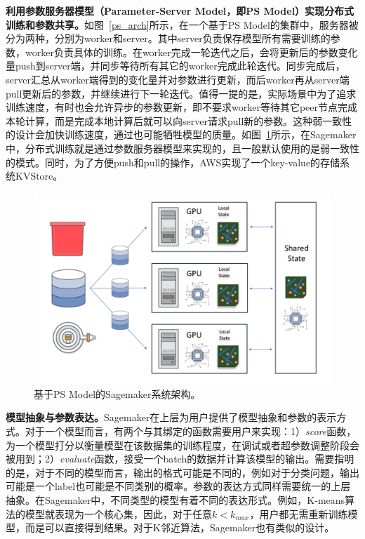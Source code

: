 \textbf{利用参数服务器模型（Parameter-Server Model，即PS Model）实现分布式训练和参数共享。}如图~\ref{ps_arch}所示，在一个基于PS Model的集群中，服务器被分为两种，分别为worker和server。其中server负责保存模型所有需要训练的参数，worker负责具体的训练。在worker完成一轮迭代之后，会将更新后的参数变化量push到server端，并同步等待所有其它的worker完成此轮迭代。同步完成后，server汇总从worker端得到的变化量并对参数进行更新，而后worker再从server端pull更新后的参数，并继续进行下一轮迭代。值得一提的是，实际场景中为了追求训练速度，有时也会允许异步的参数更新，即不要求worker等待其它peer节点完成本轮计算，而是完成本地计算后就可以向server请求pull新的参数。这种弱一致性的设计会加快训练速度，通过也可能牺牲模型的质量。如图~\ref{sagemaker_ps}所示，在Sagemaker中，分布式训练就是通过参数服务器模型来实现的，且一般默认使用的是弱一致性的模式。同时，为了方便push和pull的操作，AWS实现了一个key-value的存储系统KVStore。

\begin{figure}[h]
    \centerline{\includegraphics[width=\textwidth]{figures/sagemaker-ps.png}}
    \caption{基于PS Model的Sagemaker系统架构。}
    \label{sagemaker_ps}
\end{figure}

\textbf{模型抽象与参数表达。}Sagemaker在上层为用户提供了模型抽象和参数的表示方式。对于一个模型而言，有两个与其绑定的函数需要用户来实现：1）\textit{score}函数，为一个模型打分以衡量模型在该数据集的训练程度，在调试或者超参数调整阶段会被用到；2）\textit{evaluate}函数，接受一个batch的数据并计算该模型的输出。需要指明的是，对于不同的模型而言，输出的格式可能是不同的，例如对于分类问题，输出可能是一个label也可能是不同类别的概率。参数的表达方式同样需要统一的上层抽象。在Sagemaker中，不同类型的模型有着不同的表达形式。例如，K-means算法的模型就表现为一个核心集，因此，对于任意$k<k_{max}$，用户都无需重新训练模型，而是可以直接得到结果。对于K邻近算法，Sagemaker也有类似的设计。

